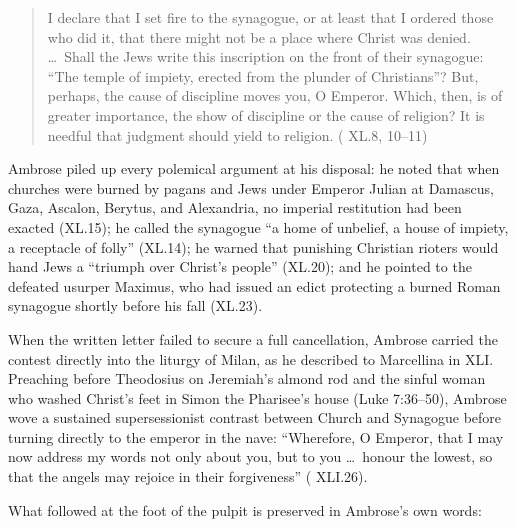 \begin{quote}
I declare that I set fire to the synagogue, or at least that I ordered those who did it, that there might not be a place where Christ was denied. \ldots\ Shall the Jews write this inscription on the front of their synagogue: ``The temple of impiety, erected from the plunder of Christians''? But, perhaps, the cause of discipline moves you, O Emperor. Which, then, is of greater importance, the show of discipline or the cause of religion? It is needful that judgment should yield to religion. ( XL.8, 10--11)
\end{quote}

Ambrose piled up every polemical argument at his disposal: he noted that when churches were burned by pagans and Jews under Emperor Julian at Damascus, Gaza, Ascalon, Berytus, and Alexandria, no imperial restitution had been exacted (XL.15); he called the synagogue ``a home of unbelief, a house of impiety, a receptacle of folly'' (XL.14); he warned that punishing Christian rioters would hand Jews a ``triumph over Christ's people'' (XL.20); and he pointed to the defeated usurper Maximus, who had issued an edict protecting a burned Roman synagogue shortly before his fall (XL.23).

When the written letter failed to secure a full cancellation, Ambrose carried the contest directly into the liturgy of Milan, as he described to Marcellina in  XLI. Preaching before Theodosius on Jeremiah's almond rod and the sinful woman who washed Christ's feet in Simon the Pharisee's house (Luke 7:36--50), Ambrose wove a sustained supersessionist contrast between Church and Synagogue before turning directly to the emperor in the nave: ``Wherefore, O Emperor, that I may now address my words not only about you, but to you \ldots\ honour the lowest, so that the angels may rejoice in their forgiveness'' ( XLI.26).

What followed at the foot of the pulpit is preserved in Ambrose's own words:


